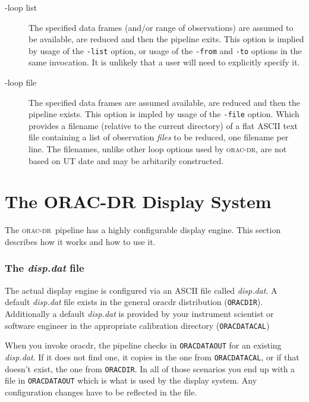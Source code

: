 \documentclass[twoside,11pt]{article}
\newcommand{\xlabel}[1]{}
\renewcommand{\_}{\texttt{\symbol{95}}}
\newcommand{\oracdr}{\textsc{orac-dr}}
\begin{document}
\begin{description}
\item[-loop list] \mbox{}

The specified data frames (and/or range of observations) are assumed
to be available, are reduced and then the pipeline exits. This option
is implied by usage of the \texttt{-list} option, or usage of the \texttt{-from}
and \texttt{-to} options in the same invocation. It is unlikely that a user
will need to explicitly specify it.

\item[-loop file] \mbox{}

The specified data frames are assumed available, are reduced and then
the pipeline exists. This option is impled by usage of the \texttt{-file}
option. Which provides a filename (relative to the current directory) of
a flat ASCII text file containing a list of observation \textit{files} to be 
reduced, one filename per line. The filenames, unlike other loop options
used by \oracdr, are not based on UT date and may be arbitarily constructed.

\end{description}

\section{The ORAC-DR Display System\label{The_ORAC-DR_Display_System}\xlabel{display_system}}

The \oracdr\ pipeline has a highly configurable display engine. This
section describes how it works and how to use it.

\subsubsection*{The \emph{disp.dat} file\label{The_ORAC-DR_Display_System_The_disp_dat_file}}

The actual display engine is configured via an ASCII file called
\emph{disp.dat}. A default \emph{disp.dat} file exists in the general oracdr
distribution (\texttt{ORAC\_DIR}). Additionally a default \emph{disp.dat} is provided
by your instrument scientist or software engineer in the appropriate
calibration directory (\texttt{ORAC\_DATA\_CAL})



When you invoke oracdr, the pipeline checks in \texttt{ORAC\_DATA\_OUT} for an
existing \emph{disp.dat}. If it does not find one, it copies in the one from
\texttt{ORAC\_DATA\_CAL}, or if that doesn't exist, the one from \texttt{ORAC\_DIR}. In
all of those scenarios you end up with a file in \texttt{ORAC\_DATA\_OUT} which
is what is used by the display system. Any configuration changes have
to be reflected in the file.
\end{document}
